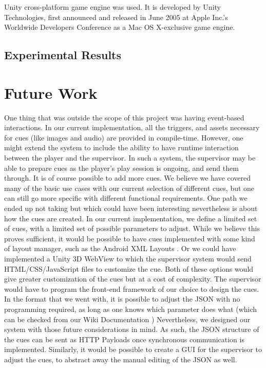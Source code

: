 \documentclass[conference]{IEEEtran}
\begin{document}
Unity cross-platform game engine was used. It is developed by Unity Technologies, first announced and released in June 2005 at Apple Inc.'s Worldwide Developers Conference as a Mac OS X-exclusive game engine.

\subsection{Experimental Results}


\section{Future Work}
One thing that was outside the scope of this project was having event-based interactions. In our current implementation, all the triggers, and assets necessary for cues (like images and audio) are provided in compile-time. However, one might extend the system to include the ability to have runtime interaction between the player and the supervisor. In such a system, the supervisor may be able to prepare cues as the player's play session is ongoing, and send them through. \newline
It is of course possible to add more cues. We believe we have covered many of the basic use cases with our current selection of different cues, but one can still go more specific with different functional requirements. \newline
One path we ended up not taking but which could have been interesting nevertheless is about how the cues are created. In our current implementation, we define a limited set of cues, with a limited set of possible parameters to adjust. While we believe this proves sufficient, it would be possible to have cues implemented with some kind of layout manager, such as the Android XML Layouts \cite{android_layouts}. Or we could have implemented a Unity 3D WebView \cite{unity_webview} to which the supervisor system would send HTML/CSS/JavaScript files to customize the cue. Both of these options would give greater customization of the cues but at a cost of complexity. The supervisor would have to program the front-end framework of our choice to design the cues. In the format that we went with, it is possible to adjust the JSON with no programming required, as long as one knows which parameter does what (which can be checked from our Wiki Documentation \cite{gitlab_wiki}) \newline
Nevertheless, we designed our system with those future considerations in mind. As such, the JSON structure of the cues can be sent as HTTP Payloads once synchronous communication is implemented. Similarly, it would be possible to create a GUI for the supervisor to adjust the cues, to abstract away the manual editing of the JSON as well. 
\end{document}
